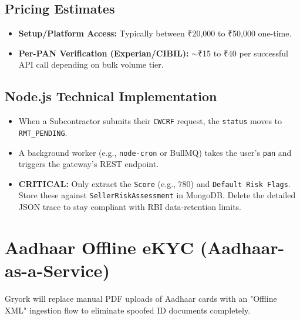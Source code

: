 \documentclass[11pt, a4paper]{report}
\begin{document}
\section{Pricing Estimates}
\begin{itemize}
    \item \textbf{Setup/Platform Access:} Typically between ₹20,000 to ₹50,000 one-time.
    \item \textbf{Per-PAN Verification (Experian/CIBIL):} $\sim$₹15 to ₹40 per successful API call depending on bulk volume tier.
\end{itemize}

\section{Node.js Technical Implementation}
\begin{itemize}
    \item When a Subcontractor submits their \texttt{CWCRF} request, the \texttt{status} moves to \texttt{RMT\_PENDING}.
    \item A background worker (e.g., \texttt{node-cron} or BullMQ) takes the user's \texttt{pan} and triggers the gateway's REST endpoint.
    \item \textbf{\textcolor{alertRed}{CRITICAL:}} Only extract the \texttt{Score} (e.g., 780) and \texttt{Default Risk Flags}. Store these against \texttt{SellerRiskAssessment} in MongoDB. Delete the detailed JSON trace to stay compliant with RBI data-retention limits.
\end{itemize}

\chapter{Aadhaar Offline eKYC (Aadhaar-as-a-Service)}

Gryork will replace manual PDF uploads of Aadhaar cards with an "Offline XML" ingestion flow to eliminate spoofed ID documents completely.
\end{document}
